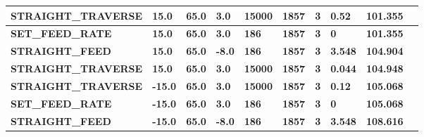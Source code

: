 \documentclass[aspectratio=169]{beamer}
\begin{document}
{\begin{frame}[fragile]
\begin{tabular}{|l|l|l|l|l|l|l|l|l|l|}
      \tiny{\bfseries{STRAIGHT\_TRAVERSE}} & 
      \tiny{\bfseries{15.0}} & 
      \tiny{\bfseries{65.0}} & 
      \tiny{\bfseries{3.0}} & 
      \tiny{\bfseries{15000}} & 
      \tiny{\bfseries{1857}} & 
      \tiny{\bfseries{3}} & 
      \tiny{\bfseries{0.52}} & 
      \tiny{\bfseries{101.355}} \\
      \hline    

      \tiny{\bfseries{SET\_FEED\_RATE}} & 
      \tiny{\bfseries{15.0}} & 
      \tiny{\bfseries{65.0}} & 
      \tiny{\bfseries{3.0}} & 
      \tiny{\bfseries{186}} & 
      \tiny{\bfseries{1857}} & 
      \tiny{\bfseries{3}} & 
      \tiny{\bfseries{0}} & 
      \tiny{\bfseries{101.355}} \\
      \hline

      \tiny{\bfseries{STRAIGHT\_FEED}} & 
      \tiny{\bfseries{15.0}} & 
      \tiny{\bfseries{65.0}} & 
      \tiny{\bfseries{-8.0}} & 
      \tiny{\bfseries{186}} & 
      \tiny{\bfseries{1857}} & 
      \tiny{\bfseries{3}} & 
      \tiny{\bfseries{3.548}} & 
      \tiny{\bfseries{104.904}} \\
      \hline

      \tiny{\bfseries{STRAIGHT\_TRAVERSE}} & 
      \tiny{\bfseries{15.0}} & 
      \tiny{\bfseries{65.0}} & 
      \tiny{\bfseries{3.0}} & 
      \tiny{\bfseries{15000}} & 
      \tiny{\bfseries{1857}} & 
      \tiny{\bfseries{3}} & 
      \tiny{\bfseries{0.044}} & 
      \tiny{\bfseries{104.948}} \\
      \hline

      \tiny{\bfseries{STRAIGHT\_TRAVERSE}} & 
      \tiny{\bfseries{-15.0}} & 
      \tiny{\bfseries{65.0}} & 
      \tiny{\bfseries{3.0}} & 
      \tiny{\bfseries{15000}} & 
      \tiny{\bfseries{1857}} & 
      \tiny{\bfseries{3}} & 
      \tiny{\bfseries{0.12}} & 
      \tiny{\bfseries{105.068}} \\
      \hline

      \tiny{\bfseries{SET\_FEED\_RATE}} & 
      \tiny{\bfseries{-15.0}} & 
      \tiny{\bfseries{65.0}} & 
      \tiny{\bfseries{3.0}} & 
      \tiny{\bfseries{186}} & 
      \tiny{\bfseries{1857}} & 
      \tiny{\bfseries{3}} & 
      \tiny{\bfseries{0}} & 
      \tiny{\bfseries{105.068}} \\
      \hline

      \tiny{\bfseries{STRAIGHT\_FEED}} & 
      \tiny{\bfseries{-15.0}} & 
      \tiny{\bfseries{65.0}} & 
      \tiny{\bfseries{-8.0}} & 
      \tiny{\bfseries{186}} & 
      \tiny{\bfseries{1857}} & 
      \tiny{\bfseries{3}} & 
      \tiny{\bfseries{3.548}} & 
      \tiny{\bfseries{108.616}} \\
      \hline


\end{tabular}
\end{frame}}
\end{document}
